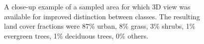 \documentclass[a4paper,10pt]{book}
\begin{document}
\begin{figure}
 \centering
 
 \caption{A close-up example of a sampled area for which 3D view was available for improved distinction between classes. The resulting land cover fractions were 87\% urban, 8\% grass, 3\% shrubs, 1\% evergreen trees, 1\% deciduous trees, 0\% others.}
 \label{fig-sampling-detailed}
\end{figure}
\end{document}
